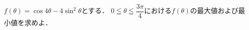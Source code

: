 \documentclass[../../main.tex]{subfiles}
\begin{document}
$f(\theta)=\cos 4\theta-4{\sin}^2\theta$とする．
$\displaystyle 0 \leqq \theta \leqq \dfrac{3\pi}{4}$における$f(\theta)$の最大値および最小値を求めよ．
\end{document}
